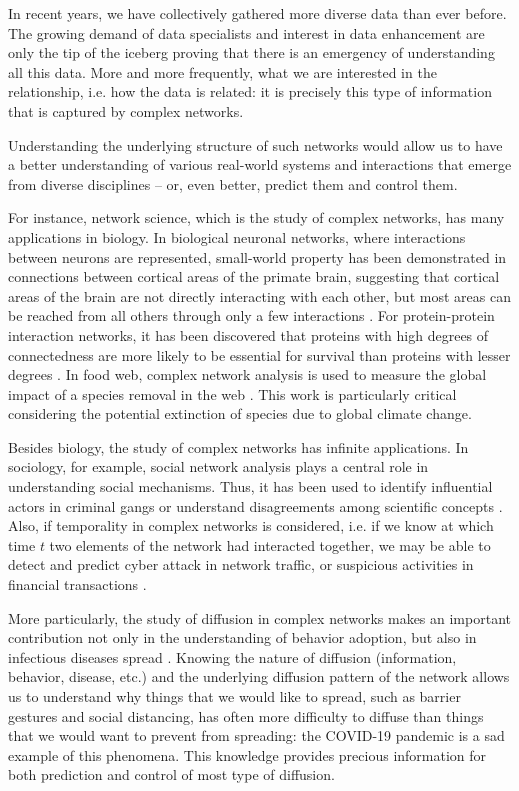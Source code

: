 \documentclass[table]{report}
\begin{document}
In recent years, we have collectively gathered more diverse data than ever before. The growing demand of data specialists and interest in data enhancement are only the tip of the iceberg proving that there is an emergency of understanding all this data. More and more frequently, what we are interested in the relationship, i.e. how the data is related: it is precisely this type of information that is captured by complex networks. 
\medbreak

Understanding the underlying structure of such networks would allow us to have a better understanding of various real-world systems and interactions that emerge from diverse disciplines – or, even better, predict them and control them. 

For instance, network science, which is the study of complex networks, has many applications in biology. In biological neuronal networks, where interactions between neurons are represented, small-world property has been demonstrated in connections between cortical areas of the primate brain, suggesting that cortical areas of the brain are not directly interacting with each other, but most areas can be reached from all others through only a few interactions \cite{klaas}. For protein-protein interaction networks, it has been discovered that proteins with high degrees of connectedness are more likely to be essential for survival than proteins with lesser degrees \cite{jeong}. In food web, complex network analysis is used to measure the global impact of a species removal in the web \cite{dunne}. This work is particularly critical considering the potential extinction of species due to global climate change.


Besides biology, the study of complex networks has infinite applications. In sociology, for example, social network analysis plays a central role in understanding social mechanisms. Thus, it has been used to identify influential actors in criminal gangs or understand disagreements among scientific concepts \cite{bouchard}. Also, if temporality in complex networks is considered, i.e. if we know at which time $t$ two elements of the network had interacted together, we may be able to detect and predict cyber attack in network traffic, or suspicious activities in financial transactions \cite{latapy_viard}.

More particularly, the study of diffusion in complex networks 
makes an important contribution not only in the understanding of behavior adoption, but also in infectious diseases spread \cite{centola}. Knowing the nature of diffusion (information, behavior, disease, etc.) and the underlying diffusion pattern of the network allows us to understand why things that we would like to spread, such as barrier gestures and social distancing, has often more difficulty to diffuse than things that we would want to prevent from spreading: the COVID-19 pandemic is a sad example of this phenomena. This knowledge provides precious information for both prediction and control of most type of diffusion. 
\bigbreak
\end{document}
